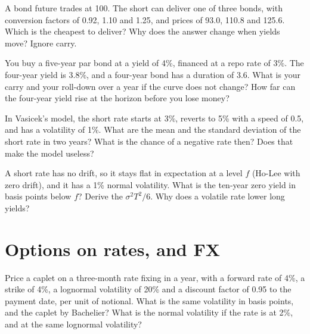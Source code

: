 \begin{question}\label{iq:iv2:rates-and-fx:22}
A bond future trades at 100. The short can deliver one of three bonds, with conversion factors of 0.92, 1.10 and 1.25, and prices of 93.0, 110.8 and 125.6. Which is the cheapest to deliver? Why does the answer change when yields move? Ignore carry.
\end{question}

\begin{question}\label{iq:iv2:rates-and-fx:23}
You buy a five-year par bond at a yield of 4\%, financed at a repo rate of 3\%. The four-year yield is 3.8\%, and a four-year bond has a duration of 3.6. What is your carry and your roll-down over a year if the curve does not change? How far can the four-year yield rise at the horizon before you lose money?
\end{question}

\begin{question}\label{iq:iv2:rates-and-fx:24}
In Vasicek's model, the short rate starts at 3\%, reverts to 5\% with a speed of 0.5, and has a volatility of 1\%. What are the mean and the standard deviation of the short rate in two years? What is the chance of a negative rate then? Does that make the model useless?
\end{question}

\begin{question}\label{iq:iv2:rates-and-fx:25}
A short rate has no drift, so it stays flat in expectation at a level $f$ (Ho-Lee with zero drift), and it has a 1\% normal volatility. What is the ten-year zero yield in basis points below $f$? Derive the $\sigma^2T^2/6$. Why does a volatile rate lower long yields?
\end{question}

\section{Options on rates, and FX}

\begin{question}\label{iq:iv2:rates-and-fx:26}
Price a caplet on a three-month rate fixing in a year, with a forward rate of 4\%, a strike of 4\%, a lognormal volatility of 20\% and a discount factor of 0.95 to the payment date, per unit of notional. What is the same volatility in basis points, and the caplet by Bachelier? What is the normal volatility if the rate is at 2\%, and at the same lognormal volatility?
\end{question}

